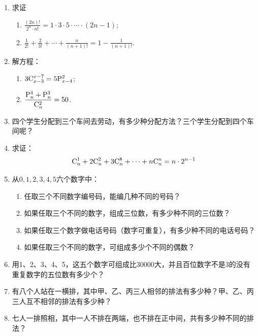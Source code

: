 \begin{enumerate}
    \item 求证
\begin{enumerate}[(1)]
    \item $\frac{(2n)!}{2^{n}\cdot  n!}=1\cdot  3\cdot  5\cdot \cdots \cdot (2n-1)$;
    \item $\frac{1}{2!}+\frac{2}{3!}+\cdots +\frac{n}{(n+1)!}=1-\frac{1}{(n+1)!}$.
\end{enumerate}

\item 解方程：
\begin{enumerate}[(1)]
    \item $3\comb{x-3}{x-7}=5\perm{x-4}{2}$;
    \item $\frac{\perm{n}{4}+\perm{n}{3}}{\comb{n}{2}}=50$.
\end{enumerate}


\item 四个学生分配到三个车间去劳动，有多少种分配方法？三个学生分配到四个车间呢？

\item 求证：
\[
\comb{n}{1}+2\comb{n}{2}+3\comb{n}{8}+\cdots +n\comb{n}{n}=n\cdot  2^{n-1}\]

\item 从$0,1,2,3,4,5$六个数字中：
\begin{enumerate}[(1)]
    \item 任取三个不同数字编号码，能编几种不同的号码？
    \item 如果任取三个不同的数字，组成三位数，有多少种不同的三位数？
    \item 如果任取三个数字做电话号码（数字可重复），有多少种不同的电话号码？
    \item 如果任取三个不同的数字，可组成多少个不同的偶数？
\end{enumerate}

 \item 用1、2、3、4、5，这五个数字可组成比30000大，并且百位数字不是3的没有重复数字的五位数有多少个？
 \item 
有八个人站在一横排，其中甲、乙、丙三人相邻的排法有多少种？甲、乙、丙三人互不相邻的排法有多少种？
 \item 七人一排照相，其中一人不排在两端，也不排在正中间，共有多少种不同的排法？


\end{enumerate}
